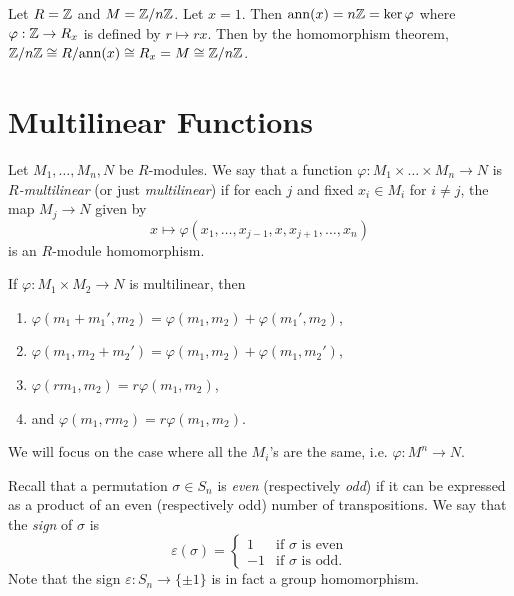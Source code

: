 \begin{example}
  Let $R = \mathbb{Z}$ and $M = \mathbb{Z} / n \mathbb{Z}$. Let $x = 1$.
  Then $\operatorname{ann}(x) = n\mathbb{Z} = \ker \varphi$ where
  $\varphi : \mathbb{Z} \to R_x$ is defined by
  $r \mapsto rx$. Then by the
  homomorphism theorem,
  $\mathbb{Z} / n\mathbb{Z} \cong R /{\operatorname{ann}(x)} \cong R_x = M \cong \mathbb{Z} / n\mathbb{Z}$.
\end{example}

\section{Multilinear Functions}
\begin{definition}
  Let $M_1, \dots, M_n, N$ be $R$-modules. We say that
  a function
  $\varphi : M_1 \times \dots \times M_n \to N$ is
  \emph{$R$-multilinear} (or just \emph{multilinear})
  if for each $j$ and fixed $x_i \in M_i$ for $i \ne j$,
  the map $M_j \to N$ given by
  \[
    x \mapsto \varphi(x_1, \dots, x_{j-1}, x, x_{j+1}, \dots, x_n)
  \]
  is an $R$-module homomorphism.
\end{definition}

\begin{exercise}
  If $\varphi : M_1 \times M_2 \to N$ is multilinear, then
  \begin{enumerate}
    \item $\varphi(m_1 + m_1', m_2) = \varphi(m_1, m_2) + \varphi(m_1', m_2)$,
    \item $\varphi(m_1, m_2 + m_2') = \varphi(m_1, m_2) + \varphi(m_1, m_2')$,
    \item $\varphi(rm_1, m_2) = r\varphi(m_1, m_2)$,
    \item and $\varphi(m_1, rm_2) = r\varphi(m_1, m_2)$.
  \end{enumerate}
\end{exercise}

\begin{remark}
  We will focus on the case where all the $M_i$'s
  are the same, i.e. $\varphi : M^n \to N$.
\end{remark}

\begin{remark}
  Recall that a permutation $\sigma \in S_n$ is
  \emph{even} (respectively \emph{odd}) if it can be
  expressed as a product of an even (respectively odd)
  number of transpositions. We say that the \emph{sign}
  of $\sigma$ is
  \[
    \varepsilon(\sigma) = \begin{cases}
      1 & \text{if $\sigma$ is even} \\
      -1 & \text{if $\sigma$ is odd}.
    \end{cases}
  \]
  Note that the sign $\varepsilon : S_n \to \{\pm 1\}$
  is in fact a group homomorphism.
\end{remark}

